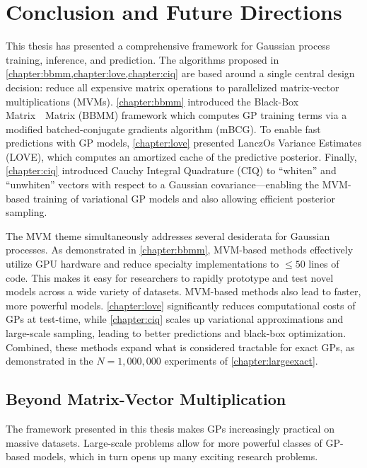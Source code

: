 \chapter{Conclusion and Future Directions}
\label{chapter:discussion}


This thesis has presented a comprehensive framework for Gaussian process training, inference, and prediction.
The algorithms proposed in \cref{chapter:bbmm,chapter:love,chapter:ciq} are based around a single central design decision: reduce all expensive matrix operations to parallelized matrix-vector multiplications (MVMs).
\cref{chapter:bbmm} introduced the Black-Box Matrix~\texttimes~Matrix (BBMM) framework which computes GP training terms via a modified batched-conjugate gradients algorithm (mBCG).
To enable fast predictions with GP models, \cref{chapter:love} presented LanczOs Variance Estimates (LOVE), which computes an amortized cache of the predictive posterior.
Finally, \cref{chapter:ciq} introduced Cauchy Integral Quadrature (CIQ) to ``whiten'' and ``unwhiten'' vectors with respect to a Gaussian covariance---enabling
the MVM-based training of variational GP models and also allowing efficient posterior sampling.

The MVM theme simultaneously addresses several desiderata for Gaussian processes.
As demonstrated in \cref{chapter:bbmm}, MVM-based methods effectively utilize GPU hardware and reduce specialty implementations to $\leq 50$ lines of code.
This makes it easy for researchers to rapidly prototype and test novel models across a wide variety of datasets.
MVM-based methods also lead to faster, more powerful models.
\cref{chapter:love} significantly reduces computational costs of GPs at test-time, while
\cref{chapter:ciq} scales up variational approximations and large-scale sampling, leading to better predictions and black-box optimization.
Combined, these methods expand what is considered tractable for exact GPs, as demonstrated in the $N=1,\!000,\!000$ experiments of \cref{chapter:largeexact}.
\clearpage



\section{Beyond Matrix-Vector Multiplication}

The framework presented in this thesis makes GPs increasingly practical on massive datasets.
Large-scale problems allow for more powerful classes of GP-based models, which in turn opens up many exciting research problems.

